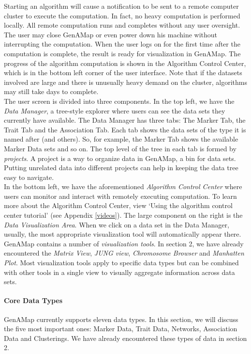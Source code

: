 \documentclass{article}
\begin{document}
Starting an algorithm will cause a notification to be sent to a remote computer cluster to execute the computation. In fact, no heavy computation is performed locally. All remote computation runs and completes without any user oversight. The user may close GenAMap or even power down his machine without interrupting the computation. When the user logs on for the first time after the computation is complete, the result is ready for visualization in GenAMap. The progress of the algorithm computation is shown in the Algorithm Control Center, which is in the bottom left corner of the user interface. Note that if the datasets involved are large and there is unusually heavy demand on the cluster, algorithms may still take days to complete.\\

The user screen is divided into three components. In the top left, we have the {\it Data Manager}, a tree-style explorer where users can see the data sets they currently have available. The Data Manager has three tabs: The Marker Tab, the Trait Tab and the Association Tab. Each tab shows the data sets of the type it is named after (and others). So, for example, the Marker Tab shows the available Marker Data sets and so on. The top level of the tree in each tab is formed by {\it projects}. A project is a way to organize data in GenAMap, a bin for data sets. Putting unrelated data into different projects can help in keeping the data tree easy to navigate.\\

In the bottom left, we have the aforementioned {\it Algorithm Control Center} where users can monitor and interact with remotely executing computation. To learn more about the Algorithm Control Center, view `Using the algorithm control center tutorial' (see Appendix \ref{videos}). The large component on the right is the {\it Data Visualization Area}. When we click on a data set in the Data Manager, usually, the most appropriate visualization tool will automatically appear there. \\

GenAMap contains a number of {\it visualization tools}. In section 2, we have already encountered the {\it Matrix View}, {\it JUNG view}, {\it Chromosome Browser} and {\it Manhatten Plot}. Most visualization tools apply to specific data types but can be combined with other tools in a single view to visually aggregate information across data sets.

\paragraph{Core Data Types} GenAMap currently supports eleven data types. In this section, we will discuss the five most important ones: Marker Data, Trait Data, Networks, Association Data and Clusterings. We have already encountered these types of data in section 2. \\
\end{document}
